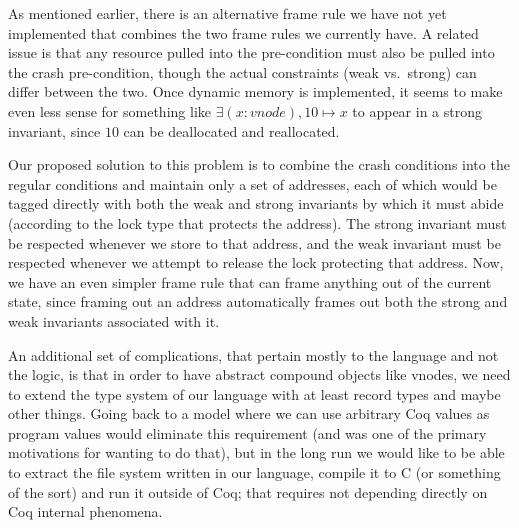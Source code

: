As mentioned earlier, there is an alternative frame rule we have not
yet implemented that combines the two
frame rules we currently have.
A related
issue is that any resource pulled into the pre-condition must also be pulled
into the crash pre-condition, though the actual constraints (weak vs.\ strong)
can differ between the two.
Once dynamic memory is implemented, it seems to make
even less sense for something like $\exists (x:vnode), 10\mapsto x$ to appear in
a strong invariant, since $10$ can be deallocated and reallocated.

Our proposed solution to this problem is to combine the crash conditions into
the regular conditions and maintain only a set of addresses, each of which
would be tagged directly with both the weak and strong invariants by which it
must abide (according to the lock type that protects the address).
The strong
invariant must be respected whenever we store
to that address, and the weak invariant must be respected whenever we attempt to
release the lock protecting that address.
Now, we have an even simpler frame
rule that can frame anything out of the current state, since framing out an
address automatically frames out both the strong and weak invariants associated
with it.

%

An additional set of complications, that pertain mostly to the
language and not the logic, is that in order to have abstract compound
objects like vnodes, we need to extend the type system of our language
with at least record types and maybe other things.
Going back to a model where we can use arbitrary Coq values as program
values would eliminate this requirement (and was one of the primary
motivations for wanting to do that), but in the long run we would
like to be able to extract the file system written in our language,
compile it to C (or something of the sort) and run it outside of Coq;
that requires not depending directly on Coq internal phenomena.

